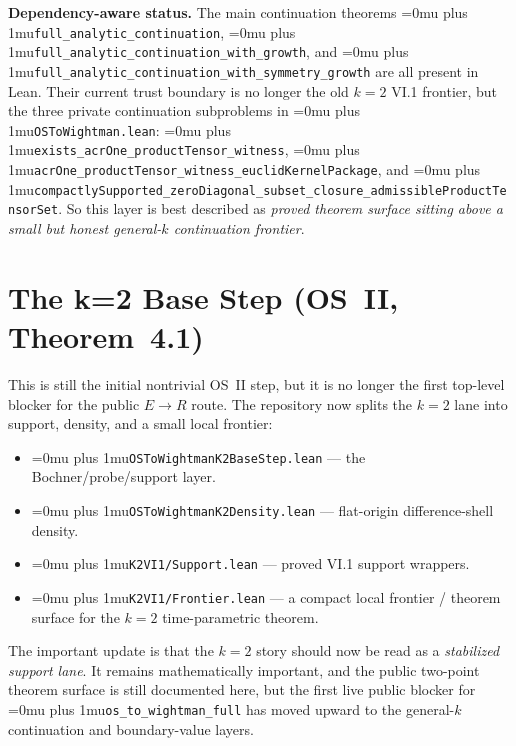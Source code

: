 \documentclass[11pt,a4paper]{article}
\newcommand{\leanfile}[1]{\begingroup\Urlmuskip=0mu plus 1mu\relax\nolinkurl{#1}\endgroup}
\newcommand{\leanname}[1]{\begingroup\Urlmuskip=0mu plus 1mu\relax\nolinkurl{#1}\endgroup}
\begin{document}
\medskip\noindent
\textbf{Dependency-aware status.}
The main continuation theorems \leanname{full\_analytic\_continuation},
\leanname{full\_analytic\_continuation\_with\_growth}, and
\leanname{full\_analytic\_continuation\_with\_symmetry\_growth} are all present
in Lean. Their current trust boundary is no longer the old $k=2$ VI.1 frontier,
but the three private continuation subproblems in \leanfile{OSToWightman.lean}:
\leanname{exists\_acrOne\_productTensor\_witness},
\leanname{acrOne\_productTensor\_witness\_euclidKernelPackage}, and
\leanname{compactlySupported\_zeroDiagonal\_subset\_closure\_admissibleProductTensorSet}.
So this layer is best described as \emph{proved theorem surface sitting above a
small but honest general-$k$ continuation frontier}.


\section{The k=2 Base Step (OS~II, Theorem~4.1)}

This is still the initial nontrivial OS~II step, but it is no longer the first
top-level blocker for the public $E \to R$ route. The repository now splits the
$k=2$ lane into support, density, and a small local frontier:
\begin{itemize}
\item \leanfile{OSToWightmanK2BaseStep.lean} --- the Bochner/probe/support layer.
\item \leanfile{OSToWightmanK2Density.lean} --- flat-origin difference-shell
  density.
\item \leanfile{K2VI1/Support.lean} --- proved VI.1 support wrappers.
\item \leanfile{K2VI1/Frontier.lean} --- a compact local frontier / theorem
  surface for the $k=2$ time-parametric theorem.
\end{itemize}

The important update is that the $k=2$ story should now be read as a
\emph{stabilized support lane}. It remains mathematically important, and the
public two-point theorem surface is still documented here, but the first live
public blocker for \leanname{os\_to\_wightman\_full} has moved upward to the
general-$k$ continuation and boundary-value layers.
\end{document}
